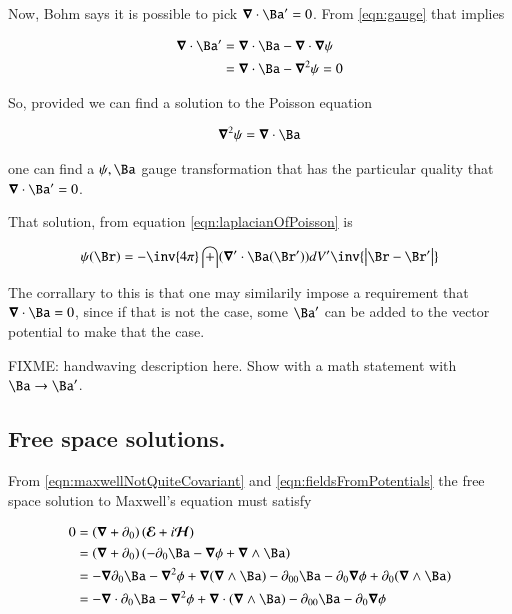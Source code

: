 \documentclass{article}
\newcommand{\EE}[0]{\boldsymbol{\mathcal{E}}}
\newcommand{\HH}[0]{\boldsymbol{\mathcal{H}}}
\begin{document}
Now, Bohm says it is possible to pick $\spacegrad \cdot \Ba' = 0$.  From \ref{eqn:gauge} that implies

\begin{align*}
\spacegrad \cdot \Ba'
&= \spacegrad \cdot \Ba - \spacegrad \cdot \spacegrad \psi \\
&= \spacegrad \cdot \Ba - \spacegrad^2 \psi = 0 \\
\end{align*}

So, provided we can find a solution to the Poisson equation

\begin{align}\label{eqn:psiForDivAPrimeEqZero}
\spacegrad^2 \psi = \spacegrad \cdot \Ba
\end{align}

one can find a $\psi, \Ba$ gauge transformation that has the particular quality that $\spacegrad \cdot \Ba' = 0$.

That solution, from equation \ref{eqn:laplacianOfPoisson} is

\begin{align*}
\psi(\Br) = -\inv{4\pi}\int (\spacegrad' \cdot \Ba(\Br')) dV' \inv{\Abs{\Br-\Br'}}
\end{align*}

The corrallary to this
is that one may similarily impose a requirement that $\spacegrad \cdot \Ba = 0$, since if that is not the case, some $\Ba'$ can be added to the vector potential to make that the case.

FIXME: handwaving description here.  Show with a math statement with $\Ba \rightarrow \Ba'$.

\subsection{ Free space solutions. }

From \ref{eqn:maxwellNotQuiteCovariant} and \ref{eqn:fieldsFromPotentials}
the free space solution to Maxwell's
equation must satisfy 

\begin{align*}
0 
&= \left(\spacegrad + \partial_0\right) (\EE + i\HH) \\
&= \left(\spacegrad + \partial_0\right) \left(- \partial_0{\Ba} - \spacegrad \phi + \spacegrad \wedge \Ba \right) \\
&= - \spacegrad \partial_0{\Ba} - \spacegrad^2 \phi + \spacegrad (\spacegrad \wedge \Ba) 
 - \partial_{00}{\Ba} - \partial_0 \spacegrad \phi + \partial_0 (\spacegrad \wedge \Ba) \\
&= - \spacegrad \cdot \partial_0{\Ba} - \spacegrad^2 \phi + \spacegrad \cdot (\spacegrad \wedge \Ba) 
 - \partial_{00}{\Ba} - \partial_0 \spacegrad \phi  \\
\end{align*}
\end{document}
